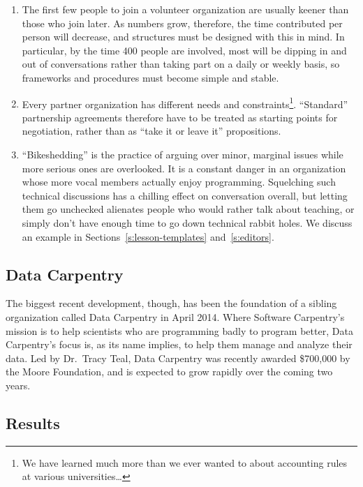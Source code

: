 \documentclass[10pt,a4paper,twocolumn]{article}
\begin{document}
\begin{enumerate}

\item
  The first few people to join a volunteer organization are usually
  keener than those who join later.  As numbers grow, therefore, the
  time contributed per person will decrease, and structures must be
  designed with this in mind.  In particular, by the time 400 people
  are involved, most will be dipping in and out of conversations
  rather than taking part on a daily or weekly basis, so frameworks
  and procedures must become simple and stable.

\item
  Every partner organization has different needs and
  constraints\footnote{We have learned much more than we ever wanted
    to about accounting rules at various universities\ldots}.
  ``Standard'' partnership agreements therefore have to
  be treated as starting points for negotiation, rather than as ``take
  it or leave it'' propositions.

\item
  ``Bikeshedding'' is the practice of arguing over minor, marginal
  issues while more serious ones are overlooked.  It is a constant
  danger in an organization whose more vocal members actually enjoy
  programming.  Squelching such technical discussions has a chilling
  effect on conversation overall, but letting them go unchecked
  alienates people who would rather talk about teaching, or simply
  don't have enough time to go down technical rabbit holes.  We
  discuss an example in Sections~\ref{s:lesson-templates}
  and~\ref{s:editors}.

\end{enumerate}

\subsection{Data Carpentry}

The biggest recent development, though, has been the foundation of a
sibling organization called Data Carpentry in April 2014.  Where
Software Carpentry's mission is to help scientists who are programming
badly to program better, Data Carpentry's focus is, as its name
implies, to help them manage and analyze their data.  Led by
Dr.\ Tracy Teal, Data Carpentry was recently awarded \$700,000 by the
Moore Foundation, and is expected to grow rapidly over the coming two
years.

\subsection{Results}
\end{document}
